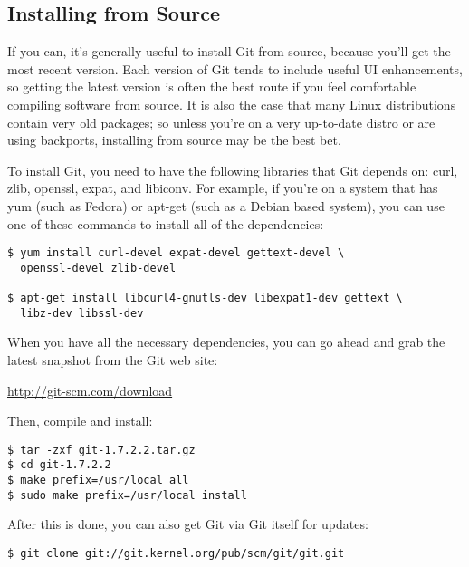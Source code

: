 \documentclass[a4paper]{book}
\newcounter{tab}[chapter]
\begin{document}
\subsection{Installing from Source}

If you can, it's generally useful to install Git from source, because you'll get the most recent version. Each version of Git tends to include useful UI enhancements, so getting the latest version is often the best route if you feel comfortable compiling software from source. It is also the case that many Linux distributions contain very old packages; so unless you're on a very up-to-date distro or are using backports, installing from source may be the best bet.

To install Git, you need to have the following libraries that Git depends on: curl, zlib, openssl, expat, and libiconv. For example, if you're on a system that has yum (such as Fedora) or apt-get (such as a Debian based system), you can use one of these commands to install all of the dependencies:

\begin{shaded}\begin{verbatim}
$ yum install curl-devel expat-devel gettext-devel \
  openssl-devel zlib-devel

$ apt-get install libcurl4-gnutls-dev libexpat1-dev gettext \
  libz-dev libssl-dev
\end{verbatim}\end{shaded}

When you have all the necessary dependencies, you can go ahead and grab the latest snapshot from the Git web site:

\url{http://git-scm.com/download}

Then, compile and install:

\begin{shaded}\begin{verbatim}
$ tar -zxf git-1.7.2.2.tar.gz
$ cd git-1.7.2.2
$ make prefix=/usr/local all
$ sudo make prefix=/usr/local install
\end{verbatim}\end{shaded}

After this is done, you can also get Git via Git itself for updates:

\begin{shaded}\begin{verbatim}
$ git clone git://git.kernel.org/pub/scm/git/git.git
\end{verbatim}\end{shaded}
\end{document}
